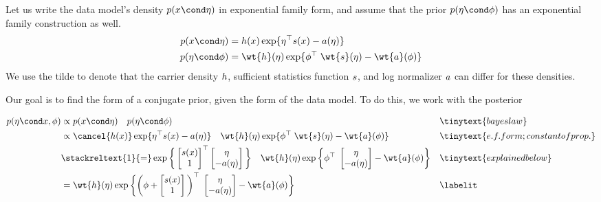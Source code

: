 
Let us write the data model's density $p(x \cond \eta)$ in exponential family form, and assume that the prior $p(\eta \cond \phi)$ has an exponential family construction as well.  
\begin{align*}
p(x \cond \eta) &= \carrierDensity(x) \exp \{\eta^\top \sufficientStatsFunction(x) - \logNormalizerFunction(\eta)   \}	 \\
p(\eta \cond \phi) &= \wt{\carrierDensity}(\eta) \exp \{\phi^\top \; \wt{\sufficientStatsFunction}(\eta) - \wt{\logNormalizerFunction}(\phi)   \}	
\end{align*}
We use the tilde to denote that the carrier density $h$, sufficient statistics function $s$, and log normalizer $a$ can differ for these densities.  

Our goal is to find the form of a conjugate prior, given the form of the data model.    To do this, we work with the posterior 

\begin{align*}
p(\eta \cond x, \phi) & \propto p(x \cond \eta) \quad p(\eta \cond \phi) && \tinytext{bayes law}  \\
&\propto  \cancel{\carrierDensity(x)} \exp \{\eta^\top \sufficientStatsFunction(x) - \logNormalizerFunction(\eta)  \}  \quad \wt{\carrierDensity}(\eta) \exp \{\phi^\top \; \wt{\sufficientStatsFunction}(\eta) - \wt{\logNormalizerFunction}(\phi)   \}	&& \tinytext{e.f. form; constant of prop.}\\
& \stackreltext{1}{=} \exp \bigg\{
\begin{bmatrix} 
\sufficientStatsFunction(x) \\
1 \\
\end{bmatrix}^\top
\begin{bmatrix} 
\eta \\
-\logNormalizerFunction(\eta)
\end{bmatrix}
\bigg\} \quad 
\wt{\carrierDensity}(\eta) \exp \bigg\{ \phi^\top \; \begin{bmatrix} 
\eta \\
-\logNormalizerFunction(\eta)
\end{bmatrix} - \wt{\logNormalizerFunction}(\phi)  \bigg\} && \tinytext{explained below} \\
&= \wt{\carrierDensity}(\eta) \exp \bigg\{ \bigg( \phi + \begin{bmatrix} 
\sufficientStatsFunction(x) \\
1 \\
\end{bmatrix} \bigg)^\top \; \begin{bmatrix} 
\eta \\
-\logNormalizerFunction(\eta)
\end{bmatrix} - \wt{\logNormalizerFunction}(\phi)  \bigg\} && 
\labelit \label{eqn:posterior_under_conjugate_prior}\\
\end{align*}

